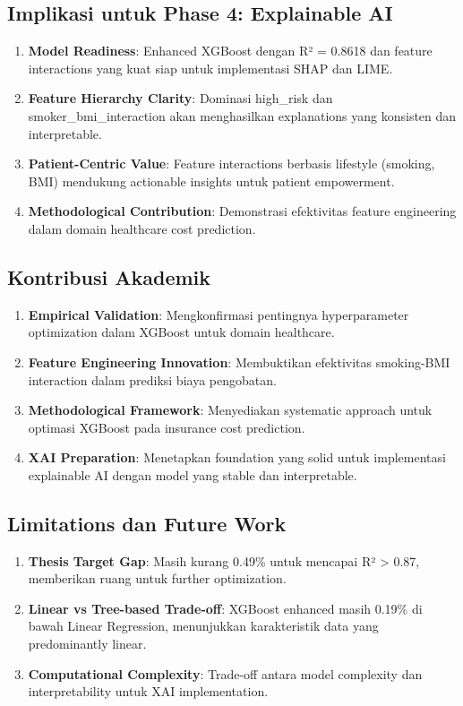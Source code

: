\subsection{Implikasi untuk Phase 4: Explainable AI}
\begin{enumerate}
    \item \textbf{Model Readiness}: Enhanced XGBoost dengan R² = 0.8618 dan feature interactions yang kuat siap untuk implementasi SHAP dan LIME.

    \item \textbf{Feature Hierarchy Clarity}: Dominasi high\_risk dan smoker\_bmi\_interaction akan menghasilkan explanations yang konsisten dan interpretable.

    \item \textbf{Patient-Centric Value}: Feature interactions berbasis lifestyle (smoking, BMI) mendukung actionable insights untuk patient empowerment.

    \item \textbf{Methodological Contribution}: Demonstrasi efektivitas feature engineering dalam domain healthcare cost prediction.
\end{enumerate}

\subsection{Kontribusi Akademik}
\begin{enumerate}
    \item \textbf{Empirical Validation}: Mengkonfirmasi pentingnya hyperparameter optimization dalam XGBoost untuk domain healthcare.

    \item \textbf{Feature Engineering Innovation}: Membuktikan efektivitas smoking-BMI interaction dalam prediksi biaya pengobatan.

    \item \textbf{Methodological Framework}: Menyediakan systematic approach untuk optimasi XGBoost pada insurance cost prediction.

    \item \textbf{XAI Preparation}: Menetapkan foundation yang solid untuk implementasi explainable AI dengan model yang stable dan interpretable.
\end{enumerate}

\subsection{Limitations dan Future Work}
\begin{enumerate}
    \item \textbf{Thesis Target Gap}: Masih kurang 0.49\% untuk mencapai R² > 0.87, memberikan ruang untuk further optimization.

    \item \textbf{Linear vs Tree-based Trade-off}: XGBoost enhanced masih 0.19\% di bawah Linear Regression, menunjukkan karakteristik data yang predominantly linear.

    \item \textbf{Computational Complexity}: Trade-off antara model complexity dan interpretability untuk XAI implementation.
\end{enumerate}

